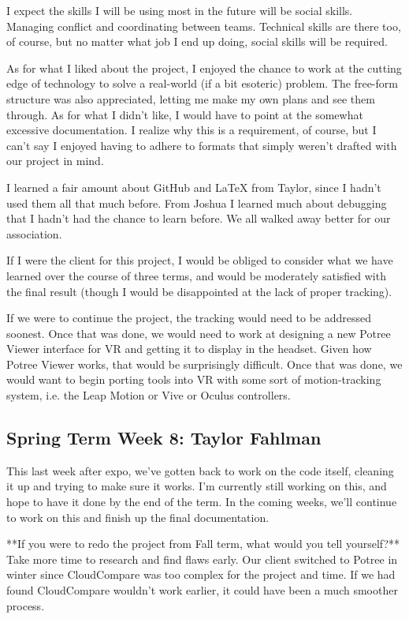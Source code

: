 \documentclass[draftclsnofoot,onecolumn]{IEEEtran}
\begin{document}
I expect the skills I will be using most in the future will be social skills. Managing conflict and coordinating between teams. Technical skills are there too, of course, but no matter what job I end up doing, social skills will be required.

As for what I liked about the project, I enjoyed the chance to work at the cutting edge of technology to solve a real-world (if a bit esoteric) problem. The free-form structure was also appreciated, letting me make my own plans and see them through. As for what I didn't like, I would have to point at the somewhat excessive documentation. I realize why this is a requirement, of course, but I can't say I enjoyed having to adhere to formats that simply weren't drafted with our project in mind.

I learned a fair amount about GitHub and LaTeX from Taylor, since I hadn't used them all that much before. From Joshua I learned much about debugging that I hadn't had the chance to learn before. We all walked away better for our association.

If I were the client for this project, I would be obliged to consider what we have learned over the course of three terms, and would be moderately satisfied with the final result (though I would be disappointed at the lack of proper tracking).

If we were to continue the project, the tracking would need to be addressed soonest. Once that was done, we would need to work at designing a new Potree Viewer interface for VR and getting it to display in the headset. Given how Potree Viewer works, that would be surprisingly difficult. Once that was done, we would want to begin porting tools into VR with some sort of motion-tracking system, i.e. the Leap Motion or Vive or Oculus controllers.

\subsection{Spring Term Week 8: Taylor Fahlman}

This last week after expo, we've gotten back to work on the code itself, cleaning it up and trying to make sure it works. I'm currently still working on this, and hope to have it done by the end of the term. In the coming weeks, we'll continue to work on this and finish up the final documentation.


**If you were to redo the project from Fall term, what would you tell yourself?**
Take more time to research and find flaws early. Our client switched to Potree in winter since CloudCompare was too complex for the project and time. If we had found CloudCompare wouldn't work earlier, it could have been a much smoother process. 
\end{document}

